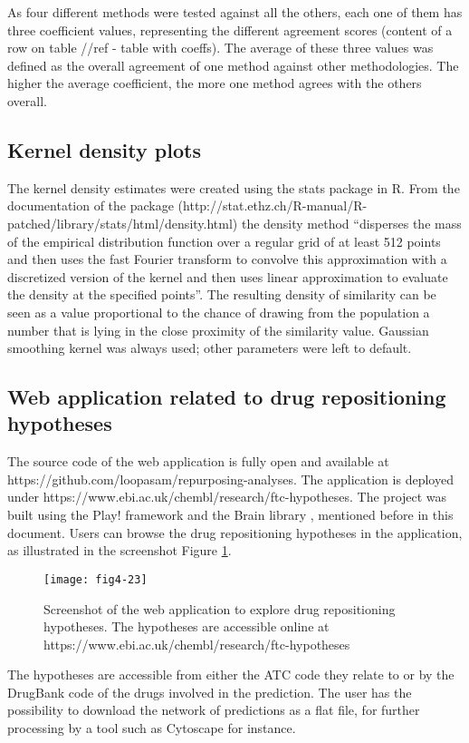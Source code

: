 As four different methods were tested against all the others, each one of them has three coefficient values, representing the different agreement scores (content of a row on table //ref - table with coeffs). The average of these three values was defined as the overall agreement of one method against other methodologies. The higher the average coefficient, the more one method agrees with the others overall.

\subsection{Kernel density plots}
The kernel density estimates were created using the stats package in R. From the documentation of the package (http://stat.ethz.ch/R-manual/R-patched/library/stats/html/density.html) the density method “disperses the mass of the empirical distribution function over a regular grid of at least 512 points and then uses the fast Fourier transform to convolve this approximation with a discretized version of the kernel and then uses linear approximation to evaluate the density at the specified points”. The resulting density of similarity can be seen as a value proportional to the chance of drawing from the population a number that is lying in the close proximity of the similarity value. Gaussian smoothing kernel was always used; other parameters were left to default.

\subsection{Web application related to drug repositioning hypotheses}
The source code of the web application is fully open and available at https://github.com/loopasam/repurposing-analyses. The application is deployed under https://www.ebi.ac.uk/chembl/research/ftc-hypotheses. The project was built using the Play! framework and the Brain library \citep{croset2013brain}, mentioned before in this document. Users can browse the drug repositioning hypotheses in the application, as illustrated in the screenshot Figure \ref{fig4-23}.

\begin{figure}[ht]
    \centering
    \texttt{[image: fig4-23]}
    \caption{Screenshot of the web application to explore drug repositioning hypotheses. The hypotheses are accessible online at https://www.ebi.ac.uk/chembl/research/ftc-hypotheses}
    \label{fig4-23}
\end{figure}

The hypotheses are accessible from either the ATC code they relate to or by the DrugBank code of the drugs involved in the prediction. The user has the possibility to download the network of predictions as a flat file, for further processing by a tool such as Cytoscape for instance.

